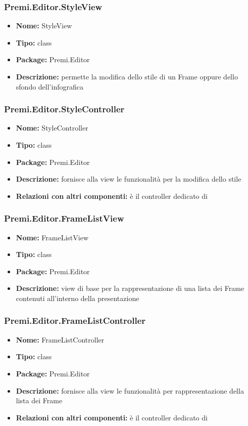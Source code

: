 \subsubsection{Premi.Editor.StyleView}
\begin{itemize}
  \item \textbf{Nome:} StyleView
  \item \textbf{Tipo:} class
  \item \textbf{Package:} Premi.Editor
  \item \textbf{Descrizione:} permette la modifica dello stile di un Frame oppure dello sfondo dell'infografica
\end{itemize}
\subsubsection{Premi.Editor.StyleController}
\begin{itemize}
  \item \textbf{Nome:} StyleController
  \item \textbf{Tipo:} class
  \item \textbf{Package:} Premi.Editor
  \item \textbf{Descrizione:} fornisce alla view le funzionalità per la modifica dello stile
  \item \textbf{Relazioni con altri componenti:} è il controller dedicato di  
\end{itemize}
\subsubsection{Premi.Editor.FrameListView}
\begin{itemize}
  \item \textbf{Nome:} FrameListView
  \item \textbf{Tipo:} class
  \item \textbf{Package:} Premi.Editor
  \item \textbf{Descrizione:} view di base per la rappresentazione di una lista dei Frame contenuti all'interno della presentazione
\end{itemize}
\subsubsection{Premi.Editor.FrameListController}
\begin{itemize}
  \item \textbf{Nome:} FrameListController
  \item \textbf{Tipo:} class
  \item \textbf{Package:} Premi.Editor
  \item \textbf{Descrizione:} fornisce alla view le funzionalità per rappresentazione della lista dei Frame
  \item \textbf{Relazioni con altri componenti:} è il controller dedicato di   
\end{itemize}




